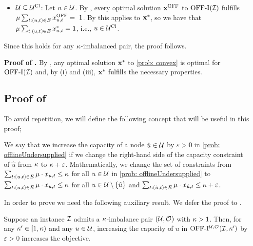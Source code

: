 {\begin{itemize}
        \item $ \mathcal U  \subseteq \mathcal U^{\mathrm{Cl}}$: Let $u \in \mathcal U$. {By , every optimal solution $\mathbf{x}^{\mathrm{OFF}}$ to $\mathrm{\mathrm{OFF}}\textrm{-}\mathrm{I}(\mathcal I)$ fulfills $\mu \sum_{t: (u,t) \in E} x^{\mathrm{OFF}}_{u,t} =~1$. By  this applies to $\mathbf{x}^*$, so we have that $\mu \sum_{t: (u,t) \in E} x^{*}_{u,t} = 1$, i.e., $u \in \mathcal U^{\mathrm{Cl}}$.}
    \end{itemize}
    Since this holds for any $\kappa$-imbalanced pair, the proof follows.
\hfill\Halmos

\noindent \textbf{Proof of .} 
By , any 
optimal solution $\mathbf{x}^*$ to \ref{prob: convex} is optimal for $\mathrm{\mathrm{OFF}}\textrm{-}\mathrm{I}(\mathcal I)$ and, by  (i) and (iii),  $\mathbf{x}^*$ fulfills the necessary properties.
\hfill\Halmos

\subsection{Proof of }
\label{proof: U and O are under/oversupplied}
To avoid repetition, we will define the following concept that will be useful in this proof;

\begin{definition}
    We say that we increase the capacity of a node $\hat{u} \in \mathcal U$ by $\varepsilon > 0$ in \ref{prob: offlineUndersupplied} if we change the right-hand side of the capacity constraint {of} %
    $\hat{u}$ {from} %
    $\kappa$ to $\kappa + \varepsilon$. Mathematically, {we change the set of constraints from $\sum_{t: (u,t) \in E } \mu \cdot  x_{u, t} \leq \kappa$ for all $u \in \mathcal U$ in \ref{prob: offlineUndersupplied} to} $\sum_{t: (u,t) \in E } \mu \cdot  x_{u, t} \leq \kappa$ for all $u \in \mathcal U \setminus \{ \hat{u}\}$ and $\sum_{t: (\hat{u},t) \in E } \mu \cdot  x_{\hat{u}, t} \leq \kappa + \varepsilon$.
\end{definition}

In order to prove {} we need the following auxiliary result. We defer the proof to .

\begin{lemma}
    \label{claim: increasing_capacity}
    Suppose an instance $\mathcal I$ admits a $\kappa$-imbalance pair $(\mathcal U, \mathcal O)$ with $\kappa > 1$. Then, for any $\kappa' \in [1, \kappa)$ and any $u \in \mathcal U$, increasing the capacity of $u$ in $\mathrm{\mathrm{OFF}}\textrm{-}\mathrm{I}^{\mathcal U, \mathcal O}(\mathcal I, \kappa')$ by $\varepsilon > 0$ increases the objective.
\end{lemma}


}
